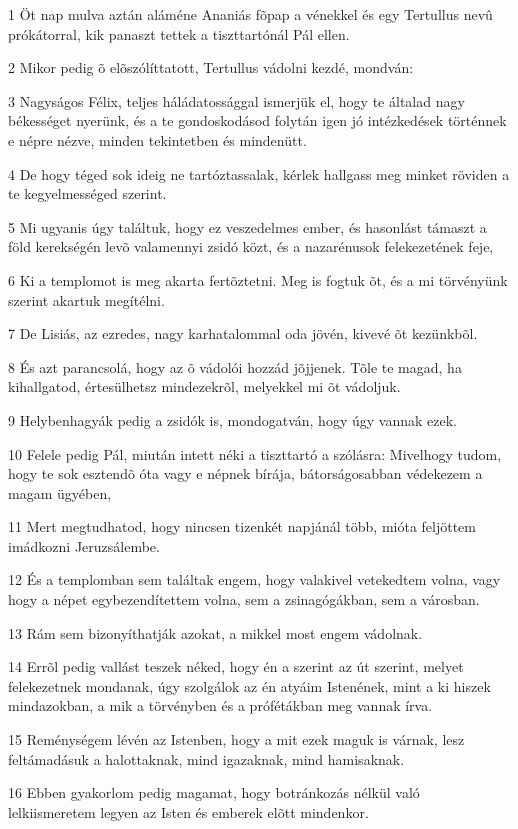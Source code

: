 \par 1 Öt nap mulva aztán aláméne Ananiás fõpap a vénekkel és egy Tertullus nevû prókátorral, kik panaszt tettek a tiszttartónál Pál ellen.
\par 2 Mikor pedig õ elõszólíttatott, Tertullus vádolni kezdé, mondván:
\par 3 Nagyságos Félix, teljes háládatossággal ismerjük el, hogy te általad nagy békességet nyerünk, és a te gondoskodásod folytán igen jó intézkedések történnek e népre nézve, minden tekintetben és mindenütt.
\par 4 De hogy téged sok ideig ne tartóztassalak, kérlek hallgass meg minket röviden a te kegyelmességed szerint.
\par 5 Mi ugyanis úgy találtuk, hogy ez veszedelmes ember, és hasonlást támaszt a föld kerekségén levõ valamennyi zsidó közt, és a nazarénusok felekezetének feje,
\par 6 Ki a templomot is meg akarta fertõztetni. Meg is fogtuk õt, és a mi törvényünk szerint akartuk megítélni.
\par 7 De Lisiás, az ezredes, nagy karhatalommal oda jövén, kivevé õt kezünkbõl.
\par 8 És azt parancsolá, hogy az õ vádolói hozzád jõjjenek. Tõle te magad, ha kihallgatod, értesülhetsz mindezekrõl, melyekkel mi õt vádoljuk.
\par 9 Helybenhagyák pedig a zsidók is, mondogatván, hogy úgy vannak ezek.
\par 10 Felele pedig Pál, miután intett néki a tiszttartó a szólásra: Mivelhogy tudom, hogy te sok esztendõ óta vagy e népnek bírája, bátorságosabban védekezem a magam ügyében,
\par 11 Mert megtudhatod, hogy nincsen tizenkét napjánál több, mióta feljöttem imádkozni Jeruzsálembe.
\par 12 És a templomban sem találtak engem, hogy valakivel vetekedtem volna, vagy hogy a népet egybezendítettem volna, sem a zsinagógákban, sem a városban.
\par 13 Rám sem bizonyíthatják azokat, a mikkel most engem vádolnak.
\par 14 Errõl pedig vallást teszek néked, hogy én a szerint az út szerint, melyet felekezetnek mondanak, úgy szolgálok az én atyáim Istenének, mint a ki hiszek mindazokban, a mik a törvényben és a prófétákban meg vannak írva.
\par 15 Reménységem lévén az Istenben, hogy a mit ezek maguk is várnak, lesz feltámadásuk a halottaknak, mind igazaknak, mind hamisaknak.
\par 16 Ebben gyakorlom pedig magamat, hogy botránkozás nélkül való lelkiismeretem legyen az Isten és emberek elõtt mindenkor.
